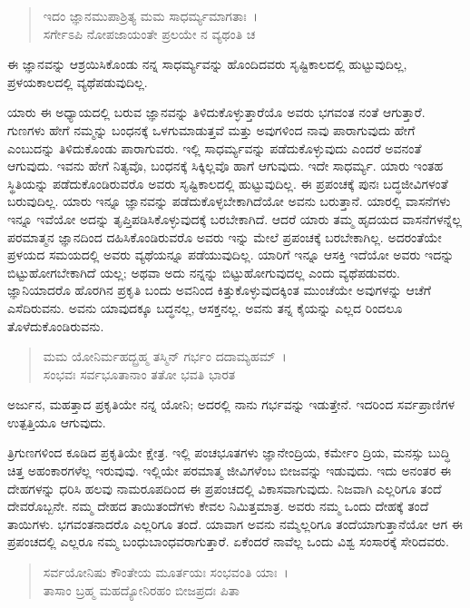 \begin{verse}
ಇದಂ ಜ್ಞಾನಮುಪಾಶ್ರಿತ್ಯ ಮಮ ಸಾಧರ್ಮ್ಯಮಾಗತಾಃ~।\\ಸರ್ಗೇಽಪಿ ನೋಪಜಾಯಂತೇ ಪ್ರಲಯೇ ನ ವ್ಯಥಂತಿ ಚ 
\end{verse}

{\small ಈ ಜ್ಞಾನವನ್ನು ಆಶ್ರಯಿಸಿಕೊಂಡು ನನ್ನ ಸಾಧರ್ಮ್ಯವನ್ನು ಹೊಂದಿದವರು ಸೃಷ್ಟಿಕಾಲದಲ್ಲಿ ಹುಟ್ಟುವುದಿಲ್ಲ, ಪ್ರಳಯಕಾಲದಲ್ಲಿ ವ್ಯಥೆಪಡುವುದಿಲ್ಲ.}

ಯಾರು ಈ ಅಧ್ಯಾಯದಲ್ಲಿ ಬರುವ ಜ್ಞಾನವನ್ನು ತಿಳಿದುಕೊಳ್ಳುತ್ತಾರೆಯೊ ಅವರು ಭಗವಂತ ನಂತೆ ಆಗುತ್ತಾರೆ. ಗುಣಗಳು ಹೇಗೆ ನಮ್ಮನ್ನು ಬಂಧನಕ್ಕೆ ಒಳಗುಮಾಡುತ್ತವೆ ಮತ್ತು ಅವುಗಳಿಂದ ನಾವು ಪಾರಾಗುವುದು ಹೇಗೆ ಎಂಬುದನ್ನು ತಿಳಿದುಕೊಂಡು ಪಾರಾಗುವರು. ಇಲ್ಲಿ ಸಾಧರ್ಮ್ಯವನ್ನು ಪಡೆದುಕೊಳ್ಳುವುದು ಎಂದರೆ ಅವನಂತೆ ಆಗುವುದು. ಇವನು ಹೇಗೆ ನಿತ್ಯವೊ, ಬಂಧನಕ್ಕೆ ಸಿಕ್ಕಿಲ್ಲವೊ ಹಾಗೆ ಆಗುವುದು. ಇದೇ ಸಾಧರ್ಮ್ಯ. ಯಾರು ಇಂತಹ ಸ್ಥಿತಿಯನ್ನು ಪಡೆದುಕೊಂಡಿರುವರೊ ಅವರು ಸೃಷ್ಟಿಕಾಲದಲ್ಲಿ ಹುಟ್ಟುವುದಿಲ್ಲ. ಈ ಪ್ರಪಂಚಕ್ಕೆ ಪುನಃ ಬದ್ಧಜೀವಿಗಳಂತೆ ಬರುವುದಿಲ್ಲ. ಯಾರು ಇನ್ನೂ ಜ್ಞಾನವನ್ನು ಪಡೆದುಕೊಳ್ಳಬೇಕಾಗಿದೆಯೋ ಅವನು ಬರುತ್ತಾನೆ. ಯಾರಲ್ಲಿ ವಾಸನೆಗಳು ಇನ್ನೂ ಇವೆಯೋ ಅದನ್ನು ತೃಪ್ತಿಪಡಿಸಿಕೊಳ್ಳುವುದಕ್ಕೆ ಬರಬೇಕಾಗಿದೆ. ಆದರೆ ಯಾರು ತಮ್ಮ ಹೃದಯದ ವಾಸನೆಗಳನ್ನೆಲ್ಲ ಪರಮಾತ್ಮನ ಜ್ಞಾನದಿಂದ ದಹಿಸಿಕೊಂಡಿರುವರೊ ಅವರು ಇನ್ನು ಮೇಲೆ ಪ್ರಪಂಚಕ್ಕೆ ಬರಬೇಕಾಗಿಲ್ಲ. ಅದರಂತೆಯೇ ಪ್ರಳಯದ ಸಮಯದಲ್ಲಿ ಅವರು ವ್ಯಥೆಯನ್ನೂ ಪಡೆಯುವುದಿಲ್ಲ. ಯಾರಿಗೆ ಇನ್ನೂ ಆಸಕ್ತಿ ಇದೆಯೋ ಅವರು ಇದನ್ನು ಬಿಟ್ಟುಹೋಗಬೇಕಾಗಿದೆ ಯಲ್ಲ; ಅಥವಾ ಅದು ನನ್ನನ್ನು ಬಿಟ್ಟುಹೋಗುವುದಲ್ಲ ಎಂದು ವ್ಯಥೆಪಡುವರು. ಜ್ಞಾನಿಯಾದರೊ ಹೊರಗಿನ ಪ್ರಕೃತಿ ಬಂದು ಅವನಿಂದ ಕಿತ್ತುಕೊಳ್ಳುವುದಕ್ಕಿಂತ ಮುಂಚೆಯೇ ಅವುಗಳನ್ನು ಆಚೆಗೆ ಎಸೆದಿರುವನು. ಅವನು ಯಾವುದಕ್ಕೂ ಬದ್ಧನಲ್ಲ, ಆಸಕ್ತನಲ್ಲ. ಅವನು ತನ್ನ ಕೈಯನ್ನು ಎಲ್ಲದ ರಿಂದಲೂ ತೊಳೆದುಕೊಂಡಿರುವನು.

\begin{verse}
ಮಮ ಯೋನಿರ್ಮಹದ್ಬ್ರಹ್ಮ ತಸ್ಮಿನ್ ಗರ್ಭಂ ದದಾಮ್ಯಹಮ್~।\\ಸಂಭವಃ ಸರ್ವಭೂತಾನಾಂ ತತೋ ಭವತಿ ಭಾರತ 
\end{verse}

{\small ಅರ್ಜುನ, ಮಹತ್ತಾದ ಪ್ರಕೃತಿಯೇ ನನ್ನ ಯೋನಿ; ಅದರಲ್ಲಿ ನಾನು ಗರ್ಭವನ್ನು ಇಡುತ್ತೇನೆ. ಇದರಿಂದ ಸರ್ವಪ್ರಾಣಿಗಳ ಉತ್ಪತ್ತಿಯೂ ಆಗುವುದು.}

ತ್ರಿಗುಣಗಳಿಂದ ಕೂಡಿದ ಪ್ರಕೃತಿಯೇ ಕ್ಷೇತ್ರ. ಇಲ್ಲಿ ಪಂಚಭೂತಗಳು ಜ್ಞಾನೇಂದ್ರಿಯ, ಕರ್ಮೇಂ ದ್ರಿಯ, ಮನಸ್ಸು ಬುದ್ಧಿ ಚಿತ್ತ ಅಹಂಕಾರಗಳೆಲ್ಲ ಇರುವುವು. ಇಲ್ಲಿಯೇ ಪರಮಾತ್ಮ ಜೀವಿಗಳೆಂಬ ಬೀಜವನ್ನು ಇಡುವುದು. ಇದು ಅನಂತರ ಈ ದೇಹಗಳನ್ನು ಧರಿಸಿ ಹಲವು ನಾಮರೂಪದಿಂದ ಈ ಪ್ರಪಂಚದಲ್ಲಿ ವಿಕಾಸವಾಗುವುದು. ನಿಜವಾಗಿ ಎಲ್ಲರಿಗೂ ತಂದೆ ದೇವರೊಬ್ಬನೇ. ನಮ್ಮ ದೇಹದ ತಾಯಿತಂದೆಗಳು ಕೇವಲ ನಿಮಿತ್ತಮಾತ್ರ. ಅವರು ನಮ್ಮ ಒಂದು ದೇಹಕ್ಕೆ ತಂದೆ ತಾಯಿಗಳು. ಭಗವಂತನಾದರೊ ಎಲ್ಲರಿಗೂ ತಂದೆ. ಯಾವಾಗ ಅವನು ನಮ್ಮೆಲ್ಲರಿಗೂ ತಂದೆಯಾಗುತ್ತಾನೆಯೋ ಆಗ ಈ ಪ್ರಪಂಚದಲ್ಲಿ ಎಲ್ಲರೂ ನಮ್ಮ ಬಂಧುಬಾಂಧವರಾಗುತ್ತಾರೆ. ಏಕೆಂದರೆ ನಾವೆಲ್ಲ ಒಂದು ವಿಶ್ವ ಸಂಸಾರಕ್ಕೆ ಸೇರಿದವರು.

\begin{verse}
ಸರ್ವಯೋನಿಷು ಕೌಂತೇಯ ಮೂರ್ತಯಃ ಸಂಭವಂತಿ ಯಾಃ~।\\ತಾಸಾಂ ಬ್ರಹ್ಮ ಮಹದ್ಯೋನಿರಹಂ ಬೀಜಪ್ರದಃ ಪಿತಾ 
\end{verse}

